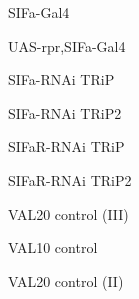 \documentclass[17pt]{extarticle}
\begin{document}
\newpage{}
\vspace*{\fill}\begin{large}
SIFa-Gal4 \\[0.5em]
\end{large}
\footnotesize
\vspace*{\fill}
\newpage{}
\vspace*{\fill}\begin{small}
UAS-rpr,SIFa-Gal4 \\[0.5em]
\end{small}
\footnotesize
\vspace*{\fill}
\newpage{}
\vspace*{\fill}\begin{normalsize}
SIFa-RNAi TRiP \\[0.5em]
\end{normalsize}
\footnotesize
\vspace*{\fill}
\newpage{}
\vspace*{\fill}\begin{normalsize}
SIFa-RNAi TRiP2 \\[0.5em]
\end{normalsize}
\footnotesize
\vspace*{\fill}
\newpage{}
\vspace*{\fill}\begin{normalsize}
SIFaR-RNAi TRiP \\[0.5em]
\end{normalsize}
\footnotesize
\vspace*{\fill}
\newpage{}
\vspace*{\fill}\begin{small}
SIFaR-RNAi TRiP2 \\[0.5em]
\end{small}
\footnotesize
\vspace*{\fill}
\newpage{}
\vspace*{\fill}\begin{small}
VAL20 control (III) \\[0.5em]
\end{small}
\footnotesize
\vspace*{\fill}
\newpage{}
\vspace*{\fill}\begin{normalsize}
VAL10 control \\[0.5em]
\end{normalsize}
\footnotesize
\vspace*{\fill}
\newpage{}
\vspace*{\fill}\begin{small}
VAL20 control (II) \\[0.5em]
\end{small}
\end{document}
